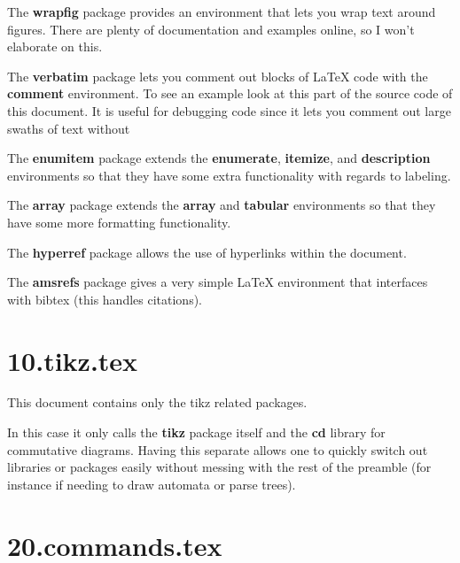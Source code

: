      The \textbf{wrapfig} package provides an environment that lets you wrap text around figures. There are plenty of documentation and examples online, so I won't elaborate on this.

      The \textbf{verbatim} package lets you comment out blocks of \LaTeX{} code with the \textbf{comment} environment. To see an example look at this part of the source code of this document. It is useful for debugging code since it lets you comment out large swaths of text without 
      \begin{comment}
        Here is a big comment.
        It spans multiple lines.
        \begin{equation}
          a=b
        \end{equation}
        Even other environments inside it are commented out.
      \end{comment}

      The \textbf{enumitem} package extends the \textbf{enumerate}, \textbf{itemize}, and \textbf{description} environments so that they have some extra functionality with regards to labeling.  
            
      The \textbf{array} package extends the \textbf{array} and \textbf{tabular} environments so that they have some more formatting functionality.

      The \textbf{hyperref} package allows the use of hyperlinks within the document. 

      The \textbf{amsrefs} package gives a very simple \LaTeX{} environment that interfaces with bibtex (this handles citations).

  \section{10.tikz.tex}\label{tikz}
    
    This document contains only the tikz related packages.

    In this case it only calls the \textbf{tikz} package itself and the \textbf{cd} library for commutative diagrams. Having this separate allows one to quickly switch out libraries or packages easily without messing with the rest of the preamble (for instance if needing to draw automata or parse trees).
  
  \section{20.commands.tex}\label{commands}

